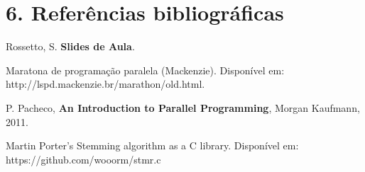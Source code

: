 \documentclass{article}
\begin{document}
\section*{6. Referências bibliográficas}
\begin{thebibliography}{9}
    Rossetto, S. \textbf{Slides de Aula}. 

    Maratona de programação paralela (Mackenzie). Disponível em: http://lspd.mackenzie.br/marathon/old.html. 

    P. Pacheco, \textbf{An Introduction to Parallel Programming}, Morgan Kaufmann, 2011.

    Martin Porter’s Stemming algorithm as a C library. Disponível em: https://github.com/wooorm/stmr.c

    
\end{thebibliography}
\end{document}
